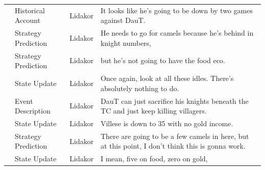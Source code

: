 {\begin{longtable}{@{}>{\theAppRow}r|L{2.3cm}L{1.0cm}U{11.55cm}@{}}
    & Historical Account    & Lidakor & It looks like he's going to be down by two games against DauT.                                                                                                                                                                                                                                  \\
    & Strategy Prediction   & Lidakor & He needs to go for camels because he's behind in knight numbers,                                                                                                                                                                                                                                \\
    & Strategy Prediction   & Lidakor & but he's not going to have the food eco.                                                                                                                                                                                                                                                        \\
    & State Update          & Lidakor & Once again, look at all these idles. There's absolutely nothing to do.                                                                                                                                                                                                                          \\
    & Event Description     & Lidakor & DauT can just sacrifice his knights beneath the TC and just keep killing villagers.                                                                                                                                                                                                             \\
    & State Update          & Lidakor & Villese is down to 35 with no gold income.                                                                                                                                                                                                                                                      \\
    & Strategy Prediction   & Lidakor & There are going to be a few camels in here, but at this point, I don't think this is gonna work.                                                                                                                                                                                                \\
    & State Update          & Lidakor & I mean, five on food, zero on gold,                                                                                                                                                                                                                                                             \\

\end{longtable}}
